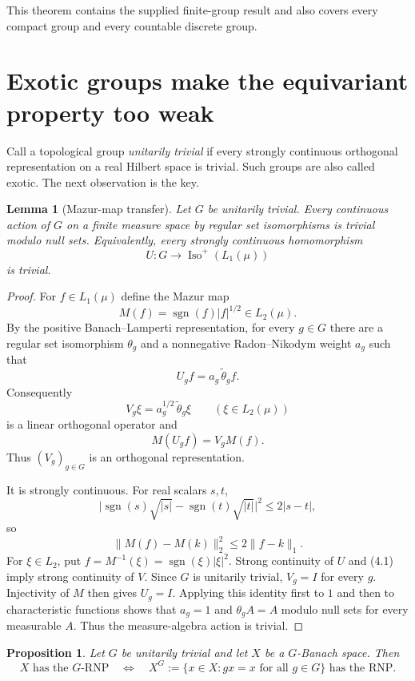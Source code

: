 \documentclass[11pt]{article}
\newtheorem{proposition}[theorem]{Proposition}
\newtheorem{lemma}[theorem]{Lemma}
\theoremstyle{remark}
\newcommand{\Iso}{\operatorname{Iso}}
\begin{document}
This theorem contains the supplied finite-group result and also covers every
compact group and every countable discrete group.

\section{Exotic groups make the equivariant property too weak}

Call a topological group \emph{unitarily trivial} if every strongly
continuous orthogonal representation on a real Hilbert space is trivial.
Such groups are also called exotic.  The next observation is the key.

\begin{lemma}[Mazur-map transfer]\label{lem:mazur}
Let $G$ be unitarily trivial.  Every continuous action of $G$ on a finite
measure space by regular set isomorphisms is trivial modulo null sets.
Equivalently, every strongly continuous homomorphism
\[
 U:G\longrightarrow\Iso^+(L_1(\mu))
\]
is trivial.
\end{lemma}

\begin{proof}
For $f\in L_1(\mu)$ define the Mazur map
\[
 M(f)=\operatorname{sgn}(f)|f|^{1/2}\in L_2(\mu).
\]
By the positive Banach--Lamperti representation, for every $g\in G$ there
are a regular set isomorphism $\theta_g$ and a nonnegative Radon--Nikodym
weight $a_g$ such that
\[
 U_gf=a_g\,\widetilde\theta_gf.
\]
Consequently
\[
 V_g\xi=a_g^{1/2}\,\widetilde\theta_g\xi
 \qquad(\xi\in L_2(\mu))
\]
is a linear orthogonal operator and
\begin{equation}
 M(U_gf)=V_gM(f).
 \tag{4.1}
\end{equation}
Thus $(V_g)_{g\in G}$ is an orthogonal representation.

It is strongly continuous.  For real scalars $s,t$,
\[
 \bigl|\operatorname{sgn}(s)\sqrt{|s|}
       -\operatorname{sgn}(t)\sqrt{|t|}\bigr|^2
 \leq 2|s-t|,
\]
so
\[
 \|M(f)-M(k)\|_2^2\leq2\|f-k\|_1.
\]
For $\xi\in L_2$, put
$f=M^{-1}(\xi)=\operatorname{sgn}(\xi)|\xi|^2$.  Strong continuity of $U$
and (4.1) imply strong continuity of $V$.  Since $G$ is unitarily trivial,
$V_g=I$ for every $g$.  Injectivity of $M$ then gives $U_g=I$.
Applying this identity first to $1$ and then to characteristic functions
shows that $a_g=1$ and $\theta_gA=A$ modulo null sets for every measurable
$A$.  Thus the measure-algebra action is trivial.
\end{proof}

\begin{proposition}\label{prop:fixed}
Let $G$ be unitarily trivial and let $X$ be a $G$-Banach space.  Then
\[
 X\text{ has the }G\text{-RNP}
 \quad\Longleftrightarrow\quad
 X^G:=\{x\in X:gx=x\text{ for all }g\in G\}\text{ has the RNP}.
\]
\end{proposition}
\end{document}
